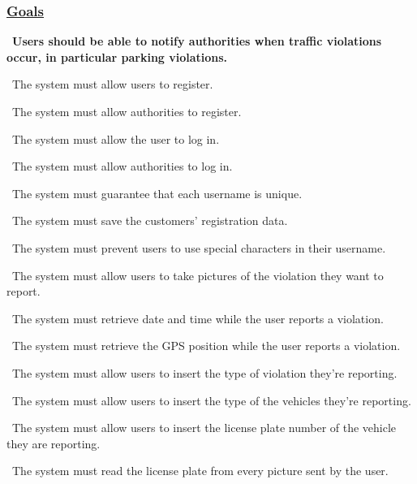 	\subsubsection[Goals]{\hyperlink{toc}{Goals}}
		\label{sec:goalSatisfaction}
		\begin{description}
			\setlength\itemsep{0.7cm}
			\item {}\ \textbf{Users should be able to notify authorities when traffic violations occur, in particular parking violations.}
				\begin{description}
					\item {}\ The system must allow users to register.
					\item {}\ The system must allow authorities to register.
					\item {}\ The system must allow the user to log in.
					\item {}\ The system must allow authorities to log in.
					\item {}\ The system must guarantee that each username is unique.
					\item {}\ The system must save the customers' registration data.
					\item {}\ The system must prevent users to use special characters in their username.
					\item {}\ The system must allow users to take pictures of the violation they want to report.
					\item {}\ The system must retrieve date and time while the user reports a violation.
					\item {}\ The system must retrieve the GPS position while the user reports a violation.
					\item {}\ The system must allow users to insert the type of violation they’re reporting.
					\item {}\ The system must allow users to insert the type of the vehicles they’re reporting.
					\item {}\ The system must allow users to insert the license plate number of the vehicle they are reporting.
					\item {}\ The system must read the license plate from every picture sent by the user.

\end{description}
\end{description}
